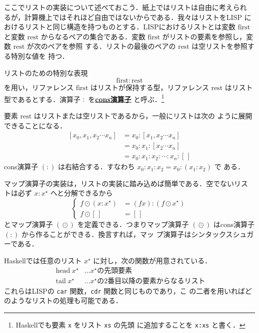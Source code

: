 \documentclass[a5paper,twoside,fleqn]{jsbook}
\newcommand{\programminglanguage}[1]{\textsf{#1}}
\newcommand{\haskell}{\programminglanguage{Haskell}}
\newcommand{\lisp}{\programminglanguage{LISP}}
\newcommand{\keyword}[1]{{\underline{\textbf{#1}}}}
\newcommand{\code}[1]{\texttt{#1}}
\newcommand{\mEmptyList}{{[\,]}}
\newcommand{\mSpecialVar}[1]{\mathrm{#1}} %
\newcommand{\mFirstVar}{\mSpecialVar{first}}
\newcommand{\mRestVar}{\mSpecialVar{rest}}
\newcommand{\mSpecialFunc}[1]{\mathrm{#1}}
\DeclareMathOperator{\mHead}{\mSpecialFunc{head}}
\DeclareMathOperator{\mTail}{\mSpecialFunc{tail}}
\DeclareMathOperator{\mMapList}{\odot}
\newcommand{\mListWith}[1]{\left[#1\right]}
\newcommand{\mList}[1]{{#1}^\mathrm{\star}}
\begin{document}
ここでリストの実装について述べておこう．紙上ではリストは自由に考えられ
るが，計算機上ではそれほど自由ではないからである．我々はリストを\lisp
におけるリストと同じ構造を持つものとする．\lisp におけるリストとは変数
$\mFirstVar$ と変数 $\mRestVar$ からなるペアの集合である．変数
$\mFirstVar$ がリストの要素を参照し，変数 $\mRestVar$ が次のペアを参照
する．リストの最後のペアの $\mRestVar$ は空リストを参照する特別な値を
持つ．

リストのための特別な表現
\begin{equation}
\mFirstVar:\mRestVar
\end{equation}
を用い，リファレンス $\mFirstVar$ はリストが保持する型，リファレンス
$\mRestVar$ はリスト型であるとする．演算子 $:$ を\keyword{cons演算子}
と呼ぶ．\footnote{\haskell でも要素 \code{x} をリスト \code{xs} の先頭
  に追加することを \code{x:xs} と書く．}

要素 $\mRestVar$ はリストまたは空リストであるから，一般にリストは次の
ように展開できることになる．
\begin{align}
\mListWith{x_0,x_1,x_2\dotsb x_n} &=x_0:\mListWith{x_1,x_2\dotsb
  x_n}\\ &=x_0:x_1:\mListWith{x_2\dotsb
  x_n}\\ &=x_0:x_1:x_2:\dotsb:x_n:\mEmptyList
\end{align}
cons演算子 $(:)$ は右結合する．すなわち $x_0:x_1:x_2=x_0:(x_1:x_2)$ で
ある．

マップ演算子の実装は，リストの実装に踏み込めば簡単である．空でないリス
トは必ず $x:\mList{x}$ へと分解できるから
\begin{equation}
\left\{
\begin{aligned}
f\mMapList{}(x:\mList{x})
&=(fx):(f\mMapList\mList{x})\\ f\mMapList\mEmptyList &=\mEmptyList
\end{aligned}
\right.
\end{equation}
とマップ演算子 $(\mMapList)$ を定義できる．つまりマップ演算子
$(\mMapList)$ はcons演算子 $(:)$ から作ることができる．換言すれば，マッ
プ演算子はシンタックスシュガーである．

\haskell では任意のリスト $\mList{x}$ に対し，次の関数が用意されている．
\begin{align*}
\mHead\mList{x}&\dots\text{$\mList{x}$の先頭要素}\\
\mTail\mList{x}&\dots\text{$\mList{x}$の2番目以降の要素からなるリスト}
\end{align*}
これらは\lisp の \code{car} 関数，\code{cdr} 関数と同じものであり，こ
の二者を用いればどのようなリストの処理も可能である．
\end{document}
